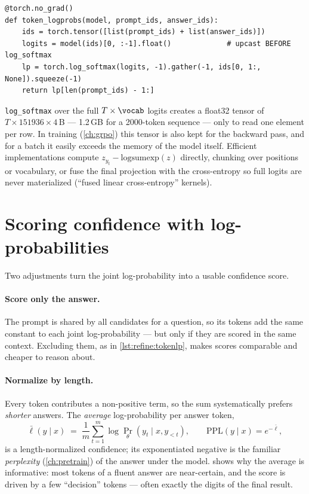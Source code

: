 \begin{lstlisting}[caption={Per-token log-probabilities in one pass (\texttt{llmsys/tts.py}).},label={lst:refine:tokenlp}]
@torch.no_grad()
def token_logprobs(model, prompt_ids, answer_ids):
    ids = torch.tensor([list(prompt_ids) + list(answer_ids)])
    logits = model(ids)[0, :-1].float()             # upcast BEFORE log_softmax
    lp = torch.log_softmax(logits, -1).gather(-1, ids[0, 1:, None]).squeeze(-1)
    return lp[len(prompt_ids) - 1:]
\end{lstlisting}

\begin{systemslens}
\texttt{log\_softmax} over the full $T \times \vocab$ logits creates a float32 tensor of
$T \times \num{151936} \times 4$\,B --- 1.2\,GB for a 2000-token sequence --- only to read one element
per row. In training (\cref{ch:grpo}) this tensor is also kept for the backward pass, and for a batch
it easily exceeds the memory of the model itself. Efficient implementations compute
$z_{y_t} - \mathrm{logsumexp}(z)$ directly, chunking over positions or vocabulary, or fuse the final
projection with the cross-entropy so full logits are never materialized (``fused linear
cross-entropy'' kernels).
\end{systemslens}

\section{Scoring confidence with log-probabilities}\label{sec:refine:confidence}


Two adjustments turn the joint log-probability into a usable confidence score.

\paragraph{Score only the answer.} The prompt is shared by all candidates for a question, so its
tokens add the same constant to each joint log-probability --- but only if they are scored in the
same context. Excluding them, as in \cref{lst:refine:tokenlp}, makes scores comparable and cheaper
to reason about.

\paragraph{Normalize by length.} Every token contributes a non-positive term, so the sum
systematically prefers \emph{shorter} answers. The \emph{average} log-probability per answer token,
\begin{equation}
  \bar\ell(y \mid x) \;=\; \frac{1}{m}\sum_{t=1}^{m} \log \Pr_\theta(y_t \mid x, y_{<t}),
  \qquad \mathrm{PPL}(y \mid x) = e^{-\bar\ell},
  \label{eq:refine:avg}
\end{equation}
is a length-normalized confidence; its exponentiated negative is the familiar \emph{perplexity}
(\cref{ch:pretrain}) of the answer under the model.  shows why the average
is informative: most tokens of a fluent answer are near-certain, and the score is driven by a few
``decision'' tokens --- often exactly the digits of the final result.


